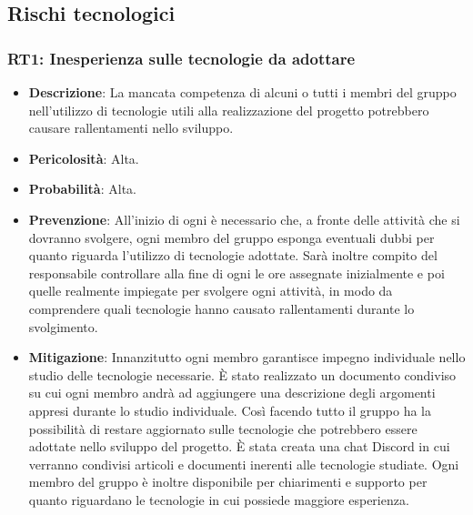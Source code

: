 \subsection{Rischi tecnologici}

\subsubsection{RT1: Inesperienza sulle tecnologie da adottare}
\begin{itemize}
    \item \textbf{Descrizione}: La mancata competenza di alcuni o tutti i membri del gruppo nell'utilizzo di tecnologie utili alla realizzazione del progetto potrebbero causare rallentamenti nello sviluppo. 
    \item \textbf{Pericolosità}: Alta.
    \item \textbf{Probabilità}: Alta.
    \item \textbf{Prevenzione}: All'inizio di ogni  è necessario che, a fronte delle attività che si dovranno svolgere, ogni membro del gruppo esponga eventuali dubbi per quanto riguarda l'utilizzo di tecnologie adottate. 
    Sarà inoltre compito del responsabile controllare alla fine di ogni  le ore assegnate inizialmente e poi quelle realmente impiegate per svolgere ogni attività, in modo da comprendere quali tecnologie hanno causato rallentamenti durante lo svolgimento.
    \item \textbf{Mitigazione}:  Innanzitutto ogni membro garantisce impegno individuale nello studio delle tecnologie necessarie.
    È stato realizzato un documento condiviso su cui ogni membro andrà ad aggiungere una descrizione degli argomenti appresi durante lo studio individuale.
    Così facendo tutto il gruppo ha la possibilità di restare aggiornato sulle tecnologie che potrebbero essere adottate nello sviluppo del progetto.
    È stata creata una chat Discord in cui verranno condivisi articoli e documenti inerenti alle tecnologie studiate.
    Ogni membro del gruppo è inoltre disponibile per chiarimenti e supporto per quanto riguardano le tecnologie in cui possiede maggiore esperienza.
\end{itemize}

